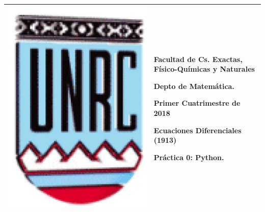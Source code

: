 \documentclass{article}
\begin{document}
\setlength{\unitlength}{1cm}
%
\setlength{\extrarowheight}{5mm}
%

\noindent\begin{tabular}{m{} m{}}\hline\hline
\includegraphics[scale=.4]{unrc.jpg} &
\begin{bfseries}  \begin{scshape}
Facultad de Cs. Exactas, F\'isico-Qu\'imicas y Naturales\par
        Depto de Matem\'atica.\par
        Primer Cuatrimestre de 2018\par
        Ecuaciones Diferenciales (1913) \par
        Pr\'actica 0: Python.

\end{scshape}
\end{bfseries}
\\
\hline\hline
\end{tabular}
\renewcommand{\theenumi}{\alph{enumi}}
\end{document}

